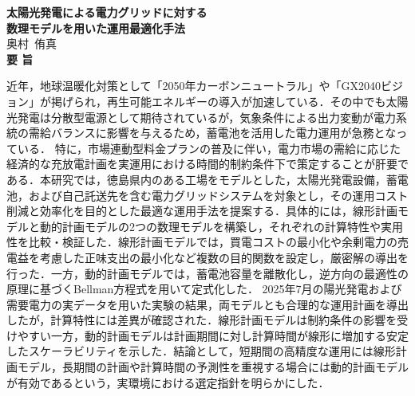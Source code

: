 \begin{titlepage}

\begin{center}
{\LARGE \bf 太陽光発電による電力グリッドに対する\\数理モデルを用いた運用最適化手法}
\\[0.7cm]
{\Large 奥村~侑真}
\\[1.0cm]
{\LARGE \bf 要\vspace{36pt}   旨\\}
\end{center}

近年，地球温暖化対策として「2050年カーボンニュートラル」や「GX2040ビジョン」が掲げられ，再生可能エネルギーの導入が加速している．その中でも太陽光発電は分散型電源として期待されているが，気象条件による出力変動が電力系統の需給バランスに影響を与えるため，蓄電池を活用した電力運用が急務となっている．
特に，市場連動型料金プランの普及に伴い，電力市場の需給に応じた経済的な充放電計画を実運用における時間的制約条件下で策定することが肝要である．本研究では，徳島県内のある工場をモデルとした，太陽光発電設備，蓄電池，および自己託送先を含む電力グリッドシステムを対象とし，その運用コスト削減と効率化を目的とした最適な運用手法を提案する．具体的には，線形計画モデルと動的計画モデルの2つの数理モデルを構築し，それぞれの計算特性や実用性を比較・検証した．線形計画モデルでは，買電コストの最小化や余剰電力の売電益を考慮した正味支出の最小化など複数の目的関数を設定し，厳密解の導出を行った．一方，動的計画モデルでは，蓄電池容量を離散化し，逆方向の最適性の原理に基づくBellman方程式を用いて定式化した．
2025年7月の陽光発電および需要電力の実データを用いた実験の結果，両モデルとも合理的な運用計画を導出したが，計算特性には差異が確認された．線形計画モデルは制約条件の影響を受けやすい一方，動的計画モデルは計画期間に対し計算時間が線形に増加する安定したスケーラビリティを示した．結論として，短期間の高精度な運用には線形計画モデル，長期間の計画や計算時間の予測性を重視する場合には動的計画モデルが有効であるという，実環境における選定指針を明らかにした．
\end{titlepage}
